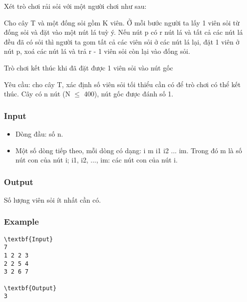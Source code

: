 

Xét trò chơi rải sỏi với một người chơi như sau:

Cho cây T và một đống sỏi gồm K viên. Ở mỗi bước người ta lấy 1 viên sỏi từ đống sỏi và đặt vào một nút lá tuỳ ý. Nếu nút p có r nút lá và tất cả các nút lá đều đã có sỏi thì người ta gom tất cả các viên sỏi ở các nút lá lại, đặt 1 viên ở nút p, xoá các nút lá và trả r - 1 viên sỏi còn lại vào đống sỏi.

Trò chơi kết thúc khi đã đặt được 1 viên sỏi vào nút gốc

Yêu cầu: cho cây T, xác định số viên sỏi tối thiểu cần có để trò chơi có thể kết thúc. Cây có n nút (N  $\le$  400), nút gốc được đánh số 1.

\subsubsection{Input}
\begin{itemize}
	\item Dòng đầu: số n.
	\item Một số dòng tiếp theo, mỗi dòng có dạng: i m i1 i2 ... im. Trong đó m là số nút con của nút i; i1, i2, ..., im: các nút con của nút i.
\end{itemize}

\subsubsection{Output}

Số lượng viên sỏi ít nhất cần có.

\subsubsection{Example}
\begin{verbatim}
\textbf{Input}
7
1 2 2 3
2 2 5 4
3 2 6 7

\textbf{Output}
3
\end{verbatim}

